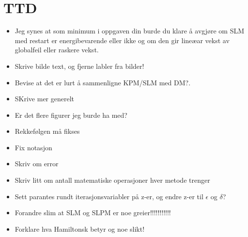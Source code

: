 \chapter{TTD}
\begin{itemize}
\item Jeg synes at som minimum i oppgaven din burde du klare å avgjøre om SLM med restart er energibevarende eller ikke og om den gir lineæar vekst av globalfeil eller raskere vekst.
\item Skrive bilde text, og fjerne labler fra bilder!
\item Bevise at det er lurt å sammenligne KPM/SLM med DM?.
\item SKrive mer generelt
\item Er det flere figurer jeg burde ha med?
\item Rekkefølgen må fikses
\item Fix notasjon
\item Skriv om error
\item Skriv litt om antall matematiske operasjoner hver metode trenger
\item Sett parantes rundt iterasjonsvariabler på z-er, og endre z-er til $\epsilon$ og $\delta$?
\item Forandre slim at SLM og SLPM er noe greier!!!!!!!!!!!
\item Forklare hva Hamiltonsk betyr og noe slikt!
\end{itemize}